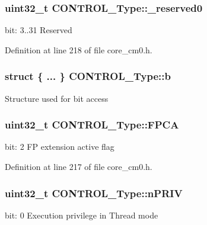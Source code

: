\subsubsection[{\texorpdfstring{\+\_\+reserved0}{_reserved0}}]{\setlength{\rightskip}{0pt plus 5cm}uint32\+\_\+t C\+O\+N\+T\+R\+O\+L\+\_\+\+Type\+::\+\_\+reserved0}\hypertarget{union_c_o_n_t_r_o_l___type_af8c314273a1e4970a5671bd7f8184f50}{}\label{union_c_o_n_t_r_o_l___type_af8c314273a1e4970a5671bd7f8184f50}
bit\+: 3..31 Reserved 

Definition at line 218 of file core\+\_\+cm0.\+h.

\subsubsection[{\texorpdfstring{b}{b}}]{\setlength{\rightskip}{0pt plus 5cm}struct \{ ... \}   C\+O\+N\+T\+R\+O\+L\+\_\+\+Type\+::b}\hypertarget{union_c_o_n_t_r_o_l___type_adc6a38ab2980d0e9577b5a871da14eb9}{}\label{union_c_o_n_t_r_o_l___type_adc6a38ab2980d0e9577b5a871da14eb9}
Structure used for bit access 
\subsubsection[{\texorpdfstring{F\+P\+CA}{FPCA}}]{\setlength{\rightskip}{0pt plus 5cm}uint32\+\_\+t C\+O\+N\+T\+R\+O\+L\+\_\+\+Type\+::\+F\+P\+CA}\hypertarget{union_c_o_n_t_r_o_l___type_ac62cfff08e6f055e0101785bad7094cd}{}\label{union_c_o_n_t_r_o_l___type_ac62cfff08e6f055e0101785bad7094cd}
bit\+: 2 FP extension active flag 

Definition at line 217 of file core\+\_\+cm0.\+h.

\subsubsection[{\texorpdfstring{n\+P\+R\+IV}{nPRIV}}]{\setlength{\rightskip}{0pt plus 5cm}uint32\+\_\+t C\+O\+N\+T\+R\+O\+L\+\_\+\+Type\+::n\+P\+R\+IV}\hypertarget{union_c_o_n_t_r_o_l___type_a35c1732cf153b7b5c4bd321cf1de9605}{}\label{union_c_o_n_t_r_o_l___type_a35c1732cf153b7b5c4bd321cf1de9605}
bit\+: 0 Execution privilege in Thread mode 

